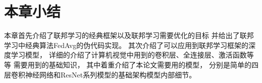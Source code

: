 








\section{本章小结}
本章首先介绍了联邦学习的经典框架以及联邦学习需要优化的目标
并给出了联邦学习中经典算法FedAvg的伪代码实现。
其次介绍了可以应用到联邦学习框架的深度学习模型，
详细的介绍了计算机视觉中用到的卷积层、全连接层、激活函数等等
需要用到的基础知识，
其中着重介绍了本论文需要用的模型，
分别是简单的四层卷积神经网络和ResNet系列模型的基础架构模型内部细节。
